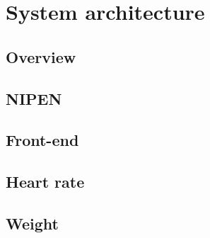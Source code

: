 
\chapter{System architecture} %

\label{Architecture} %


\section{Overview}

\section{NIPEN}
\section{Front-end}
\section{Heart rate}
\section{Weight}
